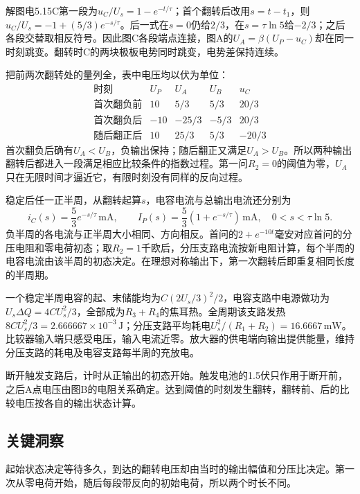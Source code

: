 \documentclass[UTF8,fontset=fandol,a4paper,11pt]{ctexart}
\begin{document}
解图电5.15C第一段为$u_C/U_s=1-e^{-t/\tau}$；首个翻转后改用$s=t-t_1$，则$u_C/U_s=-1+(5/3)e^{-s/\tau}$。后一式在$s=0$仍给$2/3$，在$s=\tau\ln5$给$-2/3$；之后各段交替取相反符号。因此图C各段端点连接，图A的$U_A=\beta(U_P-u_C)$却在同一时刻跳变。翻转时C的两块极板电势同时跳变，电势差保持连续。

把前两次翻转处的量列全，表中电压均以伏为单位：
\[
\begin{array}{c|rrrr}
\text{时刻}&U_P&U_A&U_B&u_C\\ \hline
\text{首次翻负前}&10&5/3&5/3&20/3\\
\text{首次翻负后}&-10&-25/3&-5/3&20/3\\
\text{随后翻正后}&10&25/3&5/3&-20/3
\end{array}
\]
首次翻负后确有$U_A<U_B$，负输出保持；随后翻正又满足$U_A>U_B$。所以两种输出翻转后都进入一段满足相应比较条件的指数过程。第一问$R_2=0$的阈值为零，$U_A$只在无限时间才逼近它，有限时刻没有同样的反向过程。

稳定后任一正半周，从翻转起算$s$，电容电流与总输出电流还分别为
\[
i_C(s)=\frac53e^{-s/\tau}\,\mathrm{mA},\qquad
I_P(s)=\frac53(1+e^{-s/\tau})\,\mathrm{mA},\quad 0<s<\tau\ln5.
\]
负半周的各电流与正半周大小相同、方向相反。首问的$2+e^{-10t}$毫安对应首问的分压电阻和零电荷初态；取$R_2=1$千欧后，分压支路电流按新电阻计算，每个半周的电容电流由该半周的初态决定。在理想对称输出下，第一次翻转后即重复相同长度的半周期。

一个稳定半周电容的起、末储能均为$C(2U_s/3)^2/2$，电容支路中电源做功为$U_s\Delta Q=4CU_s^2/3$，全部成为$R_3+R_4$的焦耳热。全周期该支路发热$8CU_s^2/3=2.666667\times10^{-3}\,\mathrm J$；分压支路平均耗电$U_s^2/(R_1+R_2)=16.6667\,\mathrm{mW}$。比较器输入端只感受电压，输入电流近零。放大器的供电端向输出提供能量，维持分压支路的耗电及电容支路每半周的充放电。

断开触发支路后，计时从正输出的初态开始。触发电池的1.5伏只作用于断开前，之后A点电压由图B的电阻关系确定。达到阈值的时刻发生翻转，翻转前、后的比较电压按各自的输出状态计算。




\subsection*{关键洞察}

起始状态决定等待多久，到达的翻转电压却由当时的输出幅值和分压比决定。第一次从零电荷开始，随后每段带反向的初始电荷，所以两个时长不同。

\end{document}
